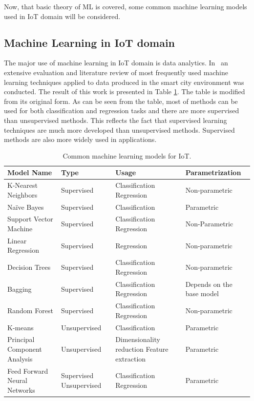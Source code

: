 \documentclass[english, 12pt, a4paper, elec, utf8, online]{aaltothesis}
\begin{document}
Now, that basic theory of ML is covered, some common machine learning models used in IoT domain will be considered.            

\subsection{Machine Learning in IoT domain}\label{sec:ml_in_iot}
The major use of machine learning in IoT domain is data analytics. In~\cite{mahdavinejad2017machine} an extensive evaluation and literature review of most frequently used machine learning techniques applied to data produced in the smart city environment was conducted. The result of this work is presented in Table \ref{tab:common_model_iot}. The table is modified from its original form. As can be seen from the table, most of methods can be used for both classification and regression tasks and there are more supervised than unsupervised methods. This reflects the fact that supervised learning techniques are much more developed than unsupervised methods. Supervised methods are also more widely used in applications.    

\begin{table}[h!]
\caption{Common machine learning models for IoT.} \label{tab:common_model_iot}
\begin{center}
\begin{tabular}{ |p{4cm}|p{2.5cm}|p{2.5cm}|p{3.2cm}| } 
\hline
\textbf{Model Name} & \textbf{Type} & \textbf{Usage}  & \textbf{Parametrization} \\
\hline
K-Nearest Neighbors & Supervised & Classification Regression  & Non-parametric \\ 
\hline 
 Naïve Bayes & Supervised & Classification & Parametric \\ 
\hline
Support Vector Machine & Supervised  & Classification Regression & Non-Parametric  \\ 
\hline 
Linear Regression  & Supervised  & Regression & Non-parametric  \\
\hline
Decision Trees  & Supervised  & Classification Regression & Non-parametric \\
\hline
Bagging  & Supervised  & Classification Regression & Depends on the base model  \\ 
\hline
Random Forest  & Supervised  & Classification Regression & Non-parametric   \\
\hline
K-means  & Unsupervised  & Classification & Parametric  \\
\hline
Principal Component Analysis  & Unsupervised  & Dimensionality reduction Feature extraction & Parametric  \\
\hline
Feed Forward Neural Networks  & Supervised Unsupervised  & Classification Regression & Parametric  \\
\hline   
\end{tabular}
\end{center}
\end{table}
\end{document}
